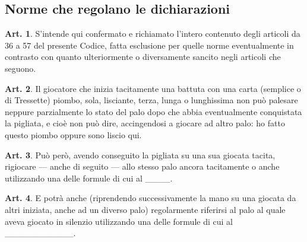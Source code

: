 \documentclass[italian,a4paper]{article}
\theoremstyle{definition}
\newtheorem{art}{Art.}
\begin{document}
\subsection{Norme che regolano le dichiarazioni}
\begin{art}
S'intende qui confermato e richiamato l'intero contenuto degli articoli da 36 a 57 del presente Codice, fatta esclusione per quelle norme eventualmente in contrasto con quanto ulteriormente o diversamente sancito negli articoli che seguono.
\end{art}
\begin{art}
Il giocatore che inizia tacitamente una battuta con una carta (semplice o di Tressette) piombo, sola, lisciante, terza, lunga o lunghissima non può palesare neppure parzialmente lo stato del palo dopo che abbia eventualmente conquistata la pigliata, e cioè non può dire, accingendosi a giocare ad altro palo: ho fatto questo piombo oppure sono liscio qui.
\end{art}
\begin{art}
Può però, avendo conseguito la pigliata su una sua giocata tacita, rigiocare
--- anche di seguito --- allo stesso palo ancora tacitamente o anche utilizzando una delle formule di cui al ____.
\end{art}
\begin{art}
E potrà anche (riprendendo successivamente la mano su una giocata da altri iniziata, anche ad un diverso palo) regolarmente riferirsi al palo al quale aveva giocato in silenzio utilizzando una delle formule di cui al ___________.
\end{art}
\end{document}
